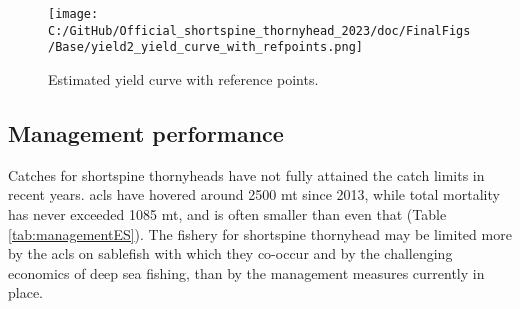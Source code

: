 \documentclass[11pt,
  english,
  letterpaper,
]{article}
\begin{document}
\begin{figure}
\centering
\texttt{[image: C:/GitHub/Official\_shortspine\_thornyhead\_2023/doc/FinalFigs/Base/yield2\_yield\_curve\_with\_refpoints.png]}
\caption{Estimated yield curve with reference points.\label{fig:yieldcurveES}}
\end{figure}

\hypertarget{management-performance}{%
\subsection*{Management performance}\label{management-performance}}

Catches for shortspine thornyheads have not fully attained the catch limits in recent years. \Gls{acl}s have hovered around 2500 mt since 2013, while total mortality has never exceeded 1085 mt, and is often smaller than even that (Table \ref{tab:managementES}). The fishery for shortspine thornyhead may be limited more by the \gls{acl}s on sablefish with which they co-occur and by the challenging economics of deep sea fishing, than by the management measures currently in place. \begingroup\fontsize{10}{12}\selectfont \begingroup\fontsize{10}{12}\selectfont
\end{document}
